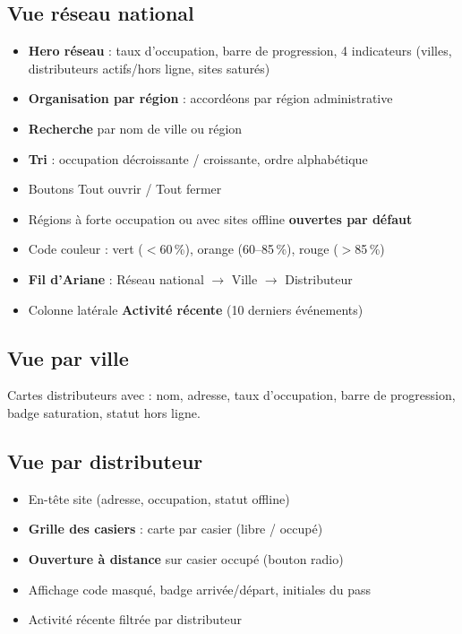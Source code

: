 \documentclass[11pt,a4paper]{article}
\begin{document}
\subsection{Vue réseau national}
\begin{itemize}
  \item \textbf{Hero réseau} : taux d'occupation, barre de progression, 4 indicateurs (villes, distributeurs actifs/hors ligne, sites saturés)
  \item \textbf{Organisation par région} : accordéons par région administrative
  \item \textbf{Recherche} par nom de ville ou région
  \item \textbf{Tri} : occupation décroissante / croissante, ordre alphabétique
  \item Boutons \og Tout ouvrir \fg{} / \og Tout fermer \fg{}
  \item Régions à forte occupation ou avec sites offline \textbf{ouvertes par défaut}
  \item Code couleur : vert ($<$60\,\%), orange (60--85\,\%), rouge ($>$85\,\%)
  \item \textbf{Fil d'Ariane} : Réseau national $\rightarrow$ Ville $\rightarrow$ Distributeur
  \item Colonne latérale \textbf{Activité récente} (10 derniers événements)
\end{itemize}

\subsection{Vue par ville}
Cartes distributeurs avec : nom, adresse, taux d'occupation, barre de progression, badge saturation, statut hors ligne.

\subsection{Vue par distributeur}
\begin{itemize}
  \item En-tête site (adresse, occupation, statut offline)
  \item \textbf{Grille des casiers} : carte par casier (libre / occupé)
  \item \textbf{Ouverture à distance} sur casier occupé (bouton radio)
  \item Affichage code masqué, badge arrivée/départ, initiales du pass
  \item Activité récente filtrée par distributeur
\end{itemize}
\end{document}
